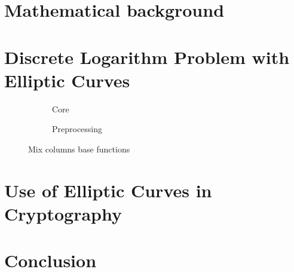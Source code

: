 \documentclass{article}
\begin{document}

\section{Mathematical background}
 


\section{Discrete Logarithm Problem with Elliptic Curves}


\begin{figure}[H]
\centering
\begin{subfigure}{.54\textwidth}
  \centering
  \caption{Core}
  \label{fig:core}
\end{subfigure}
\begin{subfigure}{.35\textwidth}
  \centering
  \caption{Preprocessing}
  \label{fig:preprocessing}
\end{subfigure}
\caption{Mix columns base functions}
\label{fig:MixColumns}
\end{figure}
 

\section{Use of Elliptic Curves in Cryptography}



\section{Conclusion}
\end{document}
